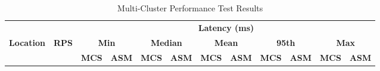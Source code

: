 \begin{table}[h]
\begin{adjustwidth}{-2cm}{-2cm}
\centering
\caption{Multi-Cluster Performance Test Results}

\begin{tabular}{|c|c|c|c|c|c|c|c|c|c|c|c|}
\hline





& & \multicolumn{10}{c|}{\textbf{Latency (ms)}} \\ \cline{3-12}
\textbf{Location} & \textbf{RPS} & \multicolumn{2}{c|}{\textbf{Min}} & \multicolumn{2}{c|}{\textbf{Median}} & \multicolumn{2}{c|}{\textbf{Mean}} & \multicolumn{2}{c|}{\textbf{95th}}  & \multicolumn{2}{c|}{\textbf{Max}} \\ \cline{3-12}
&  &  \textbf{MCS} & \textbf{ASM} & \textbf{MCS} & \textbf{ASM} & \textbf{MCS} & \textbf{ASM} & \textbf{MCS} & \textbf{ASM} & \textbf{MCS} & \textbf{ASM} \\ \hline


\end{tabular}
\end{adjustwidth}
\end{table}
